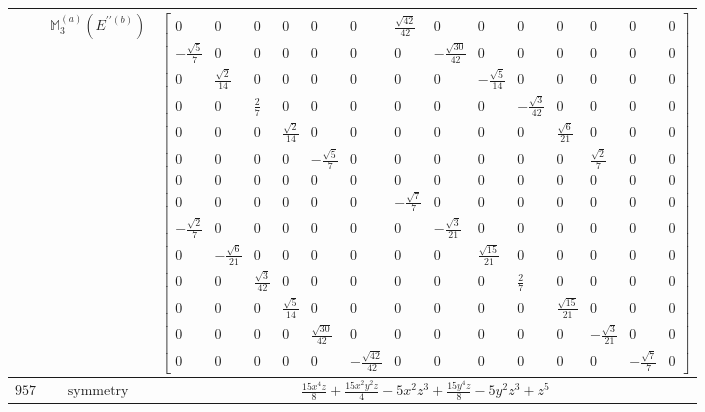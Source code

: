 \documentclass[fleqn,8pt,landscape]{jsarticle}
\begin{document}
\begin{longtable}{ccc}
$  $ & $ \mathbb{M}_{3}^{(a)}(E^{\prime\prime(b)}) $ & $ \begin{bmatrix} 0 & 0 & 0 & 0 & 0 & 0 & \frac{\sqrt{42}}{42} & 0 & 0 & 0 & 0 & 0 & 0 & 0 \\ - \frac{\sqrt{5}}{7} & 0 & 0 & 0 & 0 & 0 & 0 & - \frac{\sqrt{30}}{42} & 0 & 0 & 0 & 0 & 0 & 0 \\ 0 & \frac{\sqrt{2}}{14} & 0 & 0 & 0 & 0 & 0 & 0 & - \frac{\sqrt{5}}{14} & 0 & 0 & 0 & 0 & 0 \\ 0 & 0 & \frac{2}{7} & 0 & 0 & 0 & 0 & 0 & 0 & - \frac{\sqrt{3}}{42} & 0 & 0 & 0 & 0 \\ 0 & 0 & 0 & \frac{\sqrt{2}}{14} & 0 & 0 & 0 & 0 & 0 & 0 & \frac{\sqrt{6}}{21} & 0 & 0 & 0 \\ 0 & 0 & 0 & 0 & - \frac{\sqrt{5}}{7} & 0 & 0 & 0 & 0 & 0 & 0 & \frac{\sqrt{2}}{7} & 0 & 0 \\ 0 & 0 & 0 & 0 & 0 & 0 & 0 & 0 & 0 & 0 & 0 & 0 & 0 & 0 \\ 0 & 0 & 0 & 0 & 0 & 0 & - \frac{\sqrt{7}}{7} & 0 & 0 & 0 & 0 & 0 & 0 & 0 \\ - \frac{\sqrt{2}}{7} & 0 & 0 & 0 & 0 & 0 & 0 & - \frac{\sqrt{3}}{21} & 0 & 0 & 0 & 0 & 0 & 0 \\ 0 & - \frac{\sqrt{6}}{21} & 0 & 0 & 0 & 0 & 0 & 0 & \frac{\sqrt{15}}{21} & 0 & 0 & 0 & 0 & 0 \\ 0 & 0 & \frac{\sqrt{3}}{42} & 0 & 0 & 0 & 0 & 0 & 0 & \frac{2}{7} & 0 & 0 & 0 & 0 \\ 0 & 0 & 0 & \frac{\sqrt{5}}{14} & 0 & 0 & 0 & 0 & 0 & 0 & \frac{\sqrt{15}}{21} & 0 & 0 & 0 \\ 0 & 0 & 0 & 0 & \frac{\sqrt{30}}{42} & 0 & 0 & 0 & 0 & 0 & 0 & - \frac{\sqrt{3}}{21} & 0 & 0 \\ 0 & 0 & 0 & 0 & 0 & - \frac{\sqrt{42}}{42} & 0 & 0 & 0 & 0 & 0 & 0 & - \frac{\sqrt{7}}{7} & 0 \end{bmatrix} $ \\ \hline
$ 957 $ & $ \text{symmetry} $ & $ \frac{15 x^{4} z}{8} + \frac{15 x^{2} y^{2} z}{4} - 5 x^{2} z^{3} + \frac{15 y^{4} z}{8} - 5 y^{2} z^{3} + z^{5} $ \\

\end{longtable}
\end{document}
